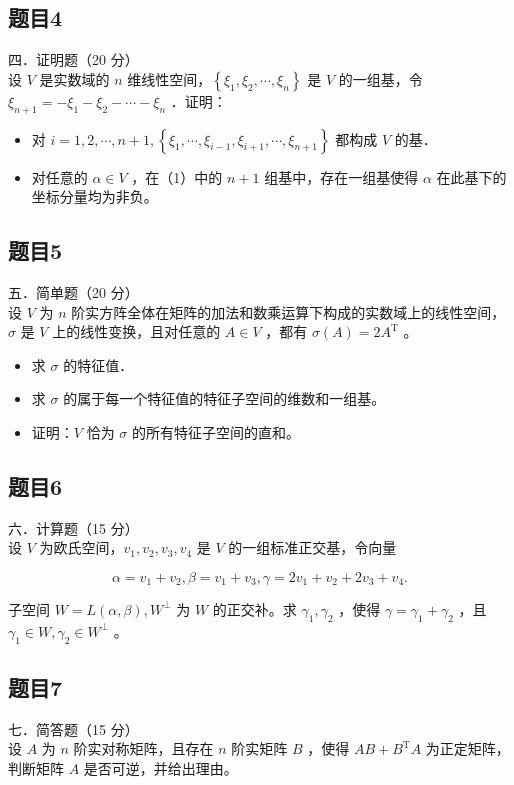 \documentclass{article}
\begin{document}
\subsection{题目4}
四．证明题（20 分）\\
设 \(V\) 是实数域的 \(n\) 维线性空间，\(\left\{\xi_{1}, \xi_{2}, \cdots, \xi_{n}\right\}\) 是 \(V\) 的一组基，令 \(\xi_{n+1}=-\xi_{1}-\xi_{2}-\cdots-\xi_{n}\) ．证明：

\begin{itemize}
  \item[（1）] 对 \(i=1,2, \cdots, n+1,\left\{\xi_{1}, \cdots, \xi_{i-1}, \xi_{i+1}, \cdots, \xi_{n+1}\right\}\) 都构成 \(V\) 的基．
  \item[（2）] 对任意的 \(\alpha \in V\) ，在（1）中的 \(n+1\) 组基中，存在一组基使得 \(\alpha\) 在此基下的坐标分量均为非负。
\end{itemize}

\subsection{题目5}
五．简单题（20 分）\\
设 \(V\) 为 \(n\) 阶实方阵全体在矩阵的加法和数乘运算下构成的实数域上的线性空间，\(\sigma\) 是 \(V\) 上的线性变换，且对任意的 \(A \in V\) ，都有 \(\sigma(A)=2 A^{\mathrm{T}}\) 。

\begin{itemize}
  \item[（1）] 求 \(\sigma\) 的特征值．
  \item[（2）] 求 \(\sigma\) 的属于每一个特征值的特征子空间的维数和一组基。
  \item[（3）] 证明：\(V\) 恰为 \(\sigma\) 的所有特征子空间的直和。
\end{itemize}

\subsection{题目6}
六．计算题（15 分）\\
设 \(V\) 为欧氏空间，\(v_{1}, v_{2}, v_{3}, v_{4}\) 是 \(V\) 的一组标准正交基，令向量

\[
\alpha=v_{1}+v_{2}, \beta=v_{1}+v_{3}, \gamma=2 v_{1}+v_{2}+2 v_{3}+v_{4} .
\]

子空间 \(W=L(\alpha, \beta), W^{\perp}\) 为 \(W\) 的正交补。求 \(\gamma_{1}, \gamma_{2}\) ，使得 \(\gamma=\gamma_{1}+\gamma_{2}\) ，且 \(\gamma_{1} \in W, \gamma_{2} \in W^{\perp}\) 。

\subsection{题目7}
七．简答题（15 分）\\
设 \(A\) 为 \(n\) 阶实对称矩阵，且存在 \(n\) 阶实矩阵 \(B\) ，使得 \(A B+B^{\mathrm{T}} A\) 为正定矩阵，判断矩阵 \(A\) 是否可逆，并给出理由。
\end{document}
